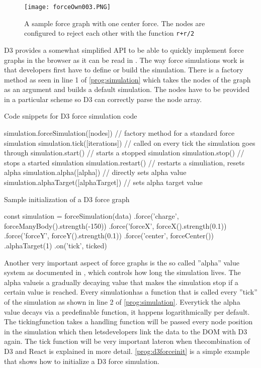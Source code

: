 \begin{figure}
  \centering
  \texttt{[image: forceOwn003.PNG]}
  \caption{A sample force graph with one center force. The nodes are configured to reject each other with the function \texttt{r+r/2}}
  \label{fig:force004}
\end{figure}

D3 provides a somewhat simplified API to be able to quickly implement force graphs in the browser as it can be read in \cite[/d3-force/blob/master/README.md]{D3Github}. The way force simulations work is that developers first have to define or build the simulation. There is a factory method as seen in line 1 of \ref{prog:simulation} which takes the nodes of the graph as an argument and builds a default simulation. The nodes have to be provided in a particular scheme so D3 can correctly parse the node array. 

\begin{program}
\caption{Code snippets for D3 force simulation code}
\label{prog:simulation}
\begin{JsCode}
simulation.forceSimulation([nodes]) // factory method for a standard force simulation
simulation.tick([iterations]) // called on every tick the simulation goes through
simulation.start() // starts a stopped simulation
simulation.stop() // stops a started simulation
simulation.restart() // restarts a simuliation, resets alpha
simulation.alpha([alpha]) // directly sets alpha value
simulation.alphaTarget([alphaTarget]) // sets alpha target value
\end{JsCode}
\end{program}

\begin{program}
\caption{Sample initialization of a D3 force graph}
\label{prog:d3forceinit}
\begin{JsCode}
const simulation = forceSimulation(data)
  .force('charge', forceManyBody().strength(-150))
  .force('forceX', forceX().strength(0.1))
  .force('forceY', forceY().strength(0.1))
  .force('center', forceCenter())
  .alphaTarget(1)
  .on('tick', ticked)
\end{JsCode}
\end{program}

Another very important aspect of force graphs is the so called ''alpha'' value system as documented in \cite[/d3-force/blob/master/README.md]{D3Github}, which controls how long the simulation lives. The alpha valueis a gradually decaying value that makes the simulation stop if a certain value is reached. Every simulationhas a function that is called every ''tick'' of the simulation as shown in line 2 of \ref{prog:simulation}. Everytick the alpha value decays via a predefinable function, it happens logarithmically per default. The tickingfunction takes a handling function will be passed every node position in the simulation which then letsdevelopers link the data to the DOM with D3 again. The tick function will be very important lateron when thecombination of D3 and React is explained in more detail. \ref{prog:d3forceinit} is a simple example that shows how to initialize a D3 force simulation.

